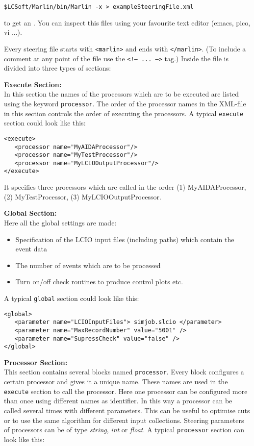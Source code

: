 \begin{verbatim}
$LCSoft/Marlin/bin/Marlin -x > exampleSteeringFile.xml
\end{verbatim}

to get an
. You can inspect this files using your favourite
text editor (emacs, pico, vi ...).

Every steering file starts with {\tt <marlin>} and ends with
{\tt </marlin>}. (To include a comment at any point of the file use the
{\tt <!-- ... -->} tag.)
Inside the file is divided into three types of sections:

{\bf Execute Section:} \\
In this section the names of the processors which are to be
executed are listed using the keyword {\tt processor}.
The order of the processor names in the XML-file in this section controls the
order of executing the processors. A typical {\tt execute} section
could look like this:

\begin{verbatim}
<execute>
   <processor name="MyAIDAProcessor"/>
   <processor name="MyTestProcessor"/>
   <processor name="MyLCIOOutputProcessor"/>
</execute>
\end{verbatim}

It specifies three processors which are called in the order
(1) MyAIDAProcessor, (2) MyTestProcessor, (3) MyLCIOOutputProcessor.

{\bf Global Section:} \\
Here all the global settings are made:
\begin{itemize}
\item Specification of the LCIO input files
      (including paths) which contain the event data
\item The number of events which are to be processed
\item Turn on/off check routines to produce control plots etc.
\end{itemize}
A typical {\tt global} section could look like this:

\begin{verbatim}
<global>
   <parameter name="LCIOInputFiles"> simjob.slcio </parameter>
   <parameter name="MaxRecordNumber" value="5001" />
   <parameter name="SupressCheck" value="false" />
</global>
\end{verbatim}

{\bf Processor Section:} \\
This section contains several blocks named {\tt processor}. Every block
configures a certain processor and gives it a unique name. These
names are used in the {\tt execute} section to call the processor.
Here one processor can be configured more than once using different
names as identifier. In this way a processor can be called several
times with different parameters. This can be useful to
optimise cuts or to use the same algorithm for different input collections.
Steering parameters of processors can be of type {\em string},
{\em int} or {\em float}.
A typical {\tt processor} section can look like this:

